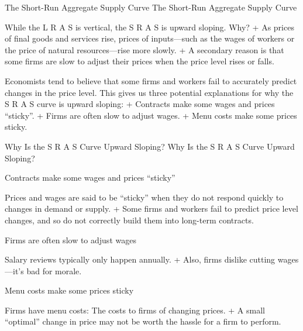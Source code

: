 \documentclass[
  12pt,
  ignorenonframetext,
]{beamer}
\begin{document}
\begin{frame}{The Short-Run Aggregate Supply Curve}
\protect\hypertarget{the-short-run-aggregate-supply-curve}{}
The Short-Run Aggregate Supply Curve

While the L R A S is vertical, the S R A S is upward sloping. Why? + As
prices of final goods and services rise, prices of inputs---such as the
wages of workers or the price of natural resources---rise more slowly. +
A secondary reason is that some firms are slow to adjust their prices
when the price level rises or falls.

Economists tend to believe that some firms and workers fail to
accurately predict changes in the price level. This gives us three
potential explanations for why the S R A S curve is upward sloping: +
Contracts make some wages and prices ``sticky''. + Firms are often slow
to adjust wages. + Menu costs make some prices sticky.
\end{frame}

\begin{frame}{Why Is the S R A S Curve Upward Sloping?}
\protect\hypertarget{why-is-the-s-r-a-s-curve-upward-sloping}{}
Why Is the S R A S Curve Upward Sloping?

Contracts make some wages and prices ``sticky''

Prices and wages are said to be ``sticky'' when they do not respond
quickly to changes in demand or supply. + Some firms and workers fail to
predict price level changes, and so do not correctly build them into
long-term contracts.

Firms are often slow to adjust wages

Salary reviews typically only happen annually. + Also, firms dislike
cutting wages---it's bad for morale.

Menu costs make some prices sticky

Firms have menu costs: The costs to firms of changing prices. + A small
``optimal'' change in price may not be worth the hassle for a firm to
perform.
\end{frame}
\end{document}
